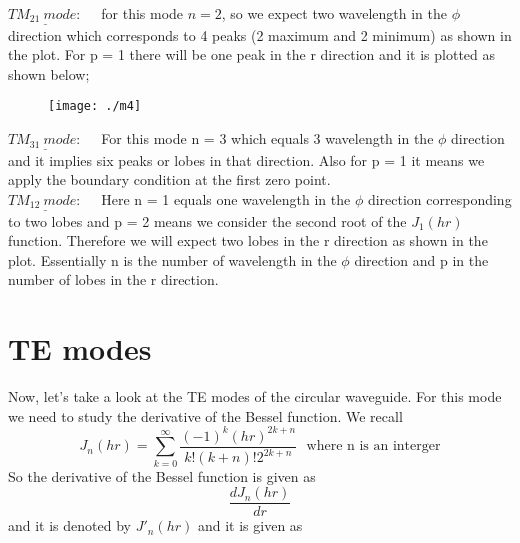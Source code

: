       $\underline{TM_{21} \ mode:}$ \ \ for this mode $n=2$, so we expect two wavelength in the $\phi$ direction which corresponds to 4 peaks (2 maximum and 2 minimum) as shown in the plot. For  p = 1 there will be one peak in the r direction and it is plotted as shown below;
      \begin{figure}[H]
      	\centering
      	\texttt{[image: ./m4]}
      	\caption{}
      	\label{fig:m4}
      \end{figure}
      $\underline{TM_{31} \ mode:}$ \  \ For this mode n = 3 which equals 3 wavelength in the $\phi$ direction and it implies six peaks or lobes in that direction. Also for p = 1  it means we apply the boundary condition at the first zero point.\\
      $\underline{TM_{12} \ mode:}$ \  \ Here n = 1 equals one wavelength in the $\phi$ direction corresponding to two lobes and p = 2 means we consider the second root of the   $J_1(hr)$ function. Therefore we will expect two lobes in the r direction as shown in the plot. Essentially n is the number of wavelength in the $\phi$  direction and p in the number of lobes in the r direction.
      
      \section{TE modes}
      
      Now, let's take a look at the TE modes of  the circular waveguide. For this mode we need to study the derivative of the Bessel function. We recall 
      $$ J_n(hr) = \sum_{k = 0}^{\infty}\dfrac{(-1)^k(hr)^{2k + n}}{k!(k+n)!2^{2k + n}} \ \ \ \text{where n is an interger}$$
      So the derivative of the Bessel function is given as $$ \dfrac{dJ_n(hr)}{dr} $$ and it is denoted by $J'_n(hr) $ and it is given as 
      
